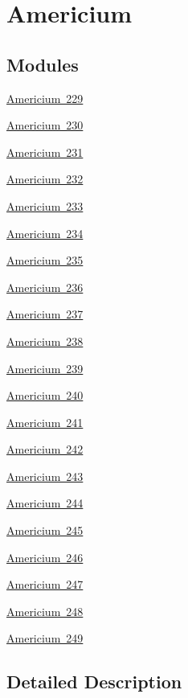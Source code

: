 \hypertarget{group___isotope_const-_americium}{}\section{Americium}
\label{group___isotope_const-_americium}
\subsection*{Modules}
\begin{DoxyCompactItemize}
\item 
\mbox{\hyperlink{group___isotope_const-_americium-_am229}{Americium 229}}
\item 
\mbox{\hyperlink{group___isotope_const-_americium-_am230}{Americium 230}}
\item 
\mbox{\hyperlink{group___isotope_const-_americium-_am231}{Americium 231}}
\item 
\mbox{\hyperlink{group___isotope_const-_americium-_am232}{Americium 232}}
\item 
\mbox{\hyperlink{group___isotope_const-_americium-_am233}{Americium 233}}
\item 
\mbox{\hyperlink{group___isotope_const-_americium-_am234}{Americium 234}}
\item 
\mbox{\hyperlink{group___isotope_const-_americium-_am235}{Americium 235}}
\item 
\mbox{\hyperlink{group___isotope_const-_americium-_am236}{Americium 236}}
\item 
\mbox{\hyperlink{group___isotope_const-_americium-_am237}{Americium 237}}
\item 
\mbox{\hyperlink{group___isotope_const-_americium-_am238}{Americium 238}}
\item 
\mbox{\hyperlink{group___isotope_const-_americium-_am239}{Americium 239}}
\item 
\mbox{\hyperlink{group___isotope_const-_americium-_am240}{Americium 240}}
\item 
\mbox{\hyperlink{group___isotope_const-_americium-_am241}{Americium 241}}
\item 
\mbox{\hyperlink{group___isotope_const-_americium-_am242}{Americium 242}}
\item 
\mbox{\hyperlink{group___isotope_const-_americium-_am243}{Americium 243}}
\item 
\mbox{\hyperlink{group___isotope_const-_americium-_am244}{Americium 244}}
\item 
\mbox{\hyperlink{group___isotope_const-_americium-_am245}{Americium 245}}
\item 
\mbox{\hyperlink{group___isotope_const-_americium-_am246}{Americium 246}}
\item 
\mbox{\hyperlink{group___isotope_const-_americium-_am247}{Americium 247}}
\item 
\mbox{\hyperlink{group___isotope_const-_americium-_am248}{Americium 248}}
\item 
\mbox{\hyperlink{group___isotope_const-_americium-_am249}{Americium 249}}
\end{DoxyCompactItemize}


\subsection{Detailed Description}
